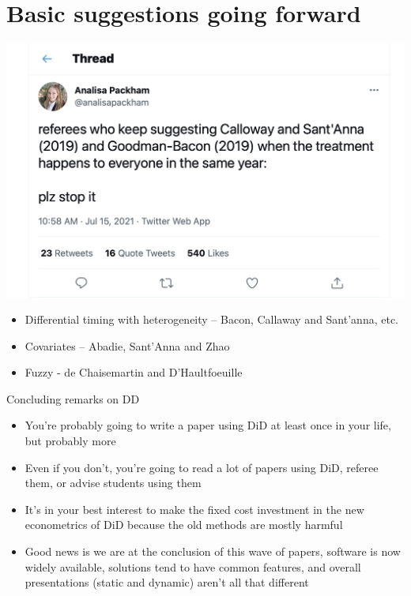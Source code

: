 \documentclass{beamer}
\begin{document}




\section{Basic suggestions going forward}

\begin{frame}

\begin{center}
\includegraphics[scale=0.15]{./lecture_includes/analisa.jpg}
\end{center}

\footnotesize
\begin{itemize}
\item Differential timing with heterogeneity -- Bacon, Callaway and Sant'anna, etc. 
\item Covariates -- Abadie, Sant'Anna and Zhao
\item Fuzzy - de Chaisemartin and D'Haultfoeuille 
\end{itemize}

\end{frame}

\begin{frame}{Concluding remarks on DD}

\begin{itemize} 
\item You're probably going to write a paper using DiD at least once in your life, but probably more
\item Even if you don't, you're going to read a lot of papers using DiD, referee them, or advise students using them
\item It's in your best interest to make the fixed cost investment in the new econometrics of DiD because the old methods are mostly harmful
\item Good news is we are at the conclusion of this wave of papers, software is now widely available, solutions tend to have common features, and overall presentations (static and dynamic) aren't all that different
\end{itemize}

\end{frame}
\end{document}
